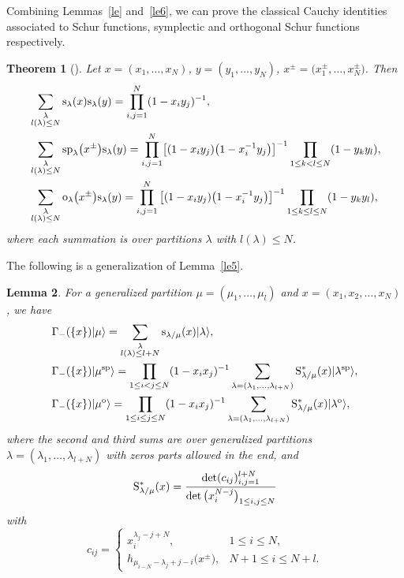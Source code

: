 \documentclass[pdftex]{sigma}
\numberwithin{equation}{section}
\newtheorem{Theorem}{Theorem}[section]
\newtheorem{Lemma}[Theorem]{Lemma}
\begin{document}
Combining Lemmas~\ref{le} and~\ref{le6}, we can prove the classical Cauchy identities associated to Schur functions, symplectic and orthogonal Schur functions respectively.
\begin{Theorem}[\cite{Be2018,KT1987,Su1990}]%
Let $x=(x_1,\dots,x_N)$, $y=(y_1,\dots,y_N)$, $x^{\pm}=\big(x^{\pm}_1,\dots,x^{\pm}_N\big)$. Then
\begin{align*}
&\sum_{\substack{\lambda\\l(\lambda)\leq N}}{\rm s}_\lambda(x){\rm s}_\lambda(y)=\prod^{N}_{i,j=1}(1-x_iy_j)^{-1},\\%
&\sum_{\substack{\lambda\\l(\lambda)\leq N}}{\rm sp}_\lambda\big(x^{\pm}\big){\rm s}_\lambda(y)=\prod^{N}_{i,j=1}\bigl[(1-x_iy_j)\big(1-x^{-1}_iy_j\big)\bigr]^{-1}\prod_{1\leq k< l\leq N}(1-y_ky_l),\\%
&\sum_{\substack{\lambda\\l(\lambda)\leq N}}{\rm o}_\lambda\big(x^{\pm}\big){\rm s}_\lambda(y)=\prod^{N}_{i,j=1}\big[(1-x_iy_j)\big(1-x^{-1}_iy_j\big)\big]^{-1}\prod_{1\leq k\leq l\leq N}(1-y_ky_l),%
\end{align*}
where each summation is over partitions $\lambda$ with $l(\lambda)\leq N$.
\end{Theorem}
The following is a generalization of Lemma~\ref{le5}.
\begin{Lemma}For a generalized partition $\mu=(\mu_1,\dots,\mu_l)$ and $x=(x_1,x_2,\dots,x_N)$, we have
\begin{align}
\label{e:sc19}&\Gamma_-(\{x\})|\mu\rangle=\sum_{\substack{\lambda\\l(\lambda)\leq l+N}}{\rm s}_{\lambda/\mu}(x)|\lambda\rangle,\\
\label{e:sp20}&\Gamma_-(\{x\})|\mu^{\rm sp}\rangle=\prod_{1\leq i<j\leq N}(1-x_ix_j)^{-1}\sum_{\lambda=(\lambda_1,\dots,\lambda_{l+N})}{\rm S}^*_{\lambda/\mu}(x)|\lambda^{\rm sp}\rangle,\\
&\Gamma_-(\{x\})|\mu^{\rm o}\rangle=\prod_{1\leq i\leq j\leq N}(1-x_ix_j)^{-1}\sum_{\lambda=(\lambda_1,\dots,\lambda_{l+N})}{\rm S}^*_{\lambda/\mu}(x)|\lambda^{\rm o}\rangle,\nonumber%
\end{align}
where the second and third sums are over generalized partitions $\lambda=(\lambda_1,\dots,\lambda_{l+N})$ with zeros parts allowed in the end, and
\begin{align*}
{\rm S}^*_{\lambda/\mu}(x)=\frac{\det(c_{ij})^{l+N}_{i,j=1}}{\det\big(x^{N-j}_i\big)_{1\leq i,j\leq N}}
\end{align*}
with
\[
c_{ij}=\begin{cases}
x^{\lambda_j-j+N}_i, &1\leq i\leq N,\\
h_{\mu_{i-N}-\lambda_j+j-i}\big(x^{\pm}\big), & N+1\leq i\leq N+l.
\end{cases}
\]
\end{Lemma}
\end{document}

